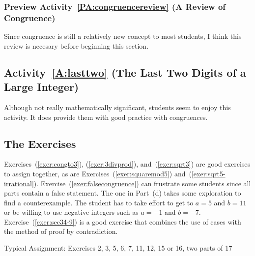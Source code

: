 \subsubsection*{Preview Activity~\ref{PA:congruencereview} (A Review of Congruence)} 
Since congruence is still a relatively new concept to most students, I think this review is necesary before beginning this section.
\hbreak


\subsection*{Activity~\ref{A:lasttwo} (The Last Two Digits of a Large Integer)}
Although not really mathematically significant, students seem to enjoy this activity.  It does provide them with good practice with congruences.
\hbreak

\subsection*{The Exercises}
Exercises~(\ref{exer:congto3}), 
(\ref{exer:3divprod}), and~(\ref{exer:sqrt3}) are good exercises to assign together, as are 
Exercises~(\ref{exer:squaremod5}) and~(\ref{exer:sqrt5-irrational}). 
Exercise~(\ref{exer:falsecongruence}) can frustrate some students since all parts contain a false statement.  The one in Part~(d) takes some exploration to find a counterexample.  The student has to take effort to get to $a = 5$ and $b = 11$ or be willing to use negative integers such as $a = -1$ and $b = -7$.  Exercise~(\ref{exer:sec34-9}) is a good exercise that combines the use of cases with the method of proof by contradiction.

\vskip6pt
\noindent
Typical Assignment:  Exercises 2, 3, 5, 6, 7, 11, 12, 15 or 16, two parts of 17
\hbreak

\endinput


Plan at most one class periods for this section.  Be careful not to have the students get too ``bogged down'' in the algebra in this section.  Some may find the algebra overwhelming.  The important idea is the distinction between constructive proofs and non-constructive proofs.  I have at times omitted this section and discussed the distinction between constructive and non-constructive proofs at appropriate times when studying other parts of the text.

\subsection*{Main Topics}
Constructive proofs of existence theorems and non-constructive proofs of existence theorems.  Be careful not to have the students get too ``bogged down'' in the algebra in this section.  Some may find the algebra overwhelming.  The important idea is the distinction between constructive proofs and non-constructive proofs.

